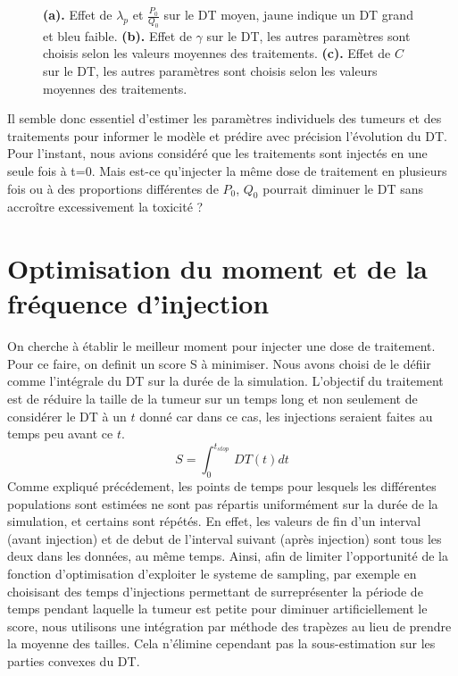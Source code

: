 \documentclass[12pt,a4paper]{article}
\begin{document}
\begin{figure}
\begin{subfigure}[t]{0.45\textwidth}
        \caption{} \label{fig:effet_C}
    \end{subfigure}

    \caption{\textbf{(a).} Effet de $\lambda_{p}$ et $\frac{P_{0}}{Q_{0}}$ sur le DT moyen, jaune indique un DT grand et bleu faible. \textbf{(b).} Effet de $\gamma$ sur le DT, les autres paramètres sont choisis selon les valeurs moyennes des traitements. \textbf{(c).} Effet de $C$ sur le DT, les autres paramètres sont choisis selon les valeurs moyennes des traitements.}

\end{figure}
Il semble donc essentiel d'estimer les paramètres individuels des tumeurs et des traitements pour informer le modèle et prédire avec précision l'évolution du \ac{DT}. 
Pour l'instant, nous avions considéré que les traitements sont injectés en une seule fois à t=0.  Mais est-ce qu'injecter la même dose de traitement en plusieurs fois ou à des proportions différentes de $P_{0}$, $Q_{0}$ pourrait diminuer le DT sans accroître excessivement la toxicité ?

\section{Optimisation du moment et de la fréquence d'injection}
On cherche à établir le meilleur moment pour injecter une dose de traitement. Pour ce faire, on definit un score S à minimiser. Nous avons choisi de le défiir comme l'intégrale du \ac{DT} sur la durée de la simulation. L'objectif du traitement est de réduire la taille de la tumeur sur un temps long et non seulement de considérer le \ac{DT} à un $t$ donné car dans ce cas, les injections seraient faites au temps peu avant ce $t$.\\
$$S=\int_{0}^{t_{stop}}\,DT(t)dt$$
Comme expliqué précédement, les points de temps pour lesquels les différentes populations sont estimées ne sont pas répartis uniformément sur la durée de la simulation, et certains sont répétés. En effet, les valeurs de fin d'un interval (avant injection) et de debut de l'interval suivant (après injection) sont tous les deux dans les données, au même temps. Ainsi, afin de limiter l'opportunité de la fonction d'optimisation d'exploiter le systeme de sampling, par exemple en choisisant des temps d'injections permettant de surreprésenter la période de temps pendant laquelle la tumeur est petite pour diminuer artificiellement le score, nous utilisons une intégration par méthode des trapèzes au lieu de prendre la moyenne des tailles. Cela n'élimine cependant pas la sous-estimation sur les parties convexes du \ac{DT}.
\end{document}
